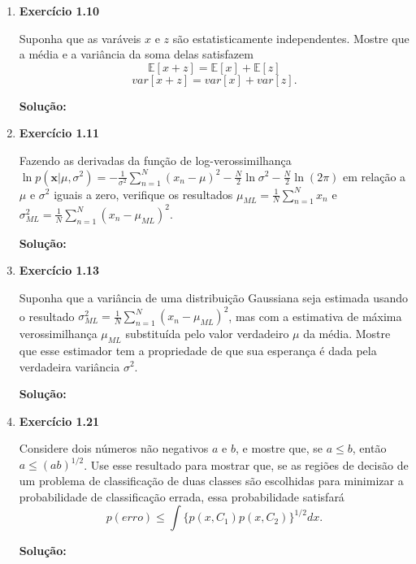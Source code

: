 \begin{enumerate}
\item \textbf{Exercício 1.10} \par

Suponha que as varáveis $x$ e $z$ são estatisticamente independentes. Mostre que a média e a variância da soma delas satisfazem
\begin{equation*}
    \mathbb{E}[x+z]=\mathbb{E}[x]+\mathbb{E}[z]
\end{equation*}
\begin{equation*}
    var[x+z]=var[x]+var[z].
\end{equation*}
\newline \par
\textbf{Solução:}

\item \textbf{Exercício 1.11} \par

Fazendo as derivadas da função de log-verossimilhança $\ln p (\boldsymbol{x}|\mu, \sigma^2) = -\frac{1}{\sigma^2}\sum_{n=1}^{N}(x_n-\mu)^2-\frac{N}{2}\ln \sigma^2 - \frac{N}{2}\ln (2\pi)$ em relação a $\mu$ e $\sigma^2$ iguais a zero, verifique os resultados $\mu_{ML}=\frac{1}{N}\sum_{n=1}^{N}x_n$ e $\sigma_{ML}^2=\frac{1}{N}\sum_{n=1}^{N}(x_n-\mu_{ML})^2$.
\newline \par
\textbf{Solução:}

\item \textbf{Exercício 1.13} \par

Suponha que a variância de uma distribuição Gaussiana seja estimada usando o resultado $\sigma_{ML}^2=\frac{1}{N}\sum_{n=1}^{N}(x_n-\mu_{ML})^2$, mas com a estimativa de máxima verossimilhança $\mu_{ML}$ substituída pelo valor verdadeiro $\mu$ da média. Mostre que esse estimador tem a propriedade de que sua esperança é dada pela verdadeira variância $\sigma^2$.
\newline \par
\textbf{Solução:}

\item \textbf{Exercício 1.21} \par

Considere dois números não negativos $a$ e $b$, e mostre que, se $a\leq b$, então $a \leq (ab)^{1/2}$. Use esse resultado para mostrar que, se as regiões de decisão de um problema de classificação de duas classes são escolhidas para minimizar a probabilidade de classificação errada, essa probabilidade satisfará
\begin{equation*}
    p(erro) \leq \int \{p(x,C_1)p(x,C_2)\}^{1/2}dx.
\end{equation*}
\newline \par
\textbf{Solução:}


\end{enumerate}
